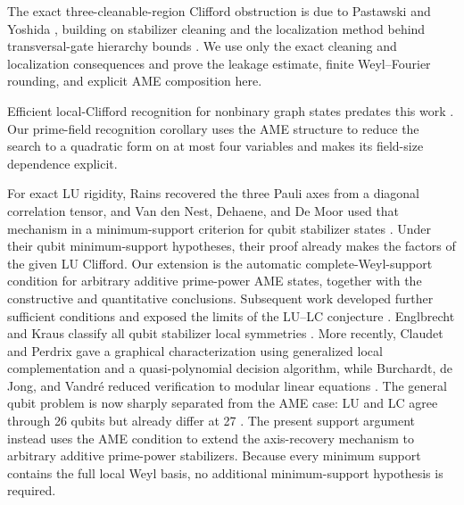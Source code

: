 The exact three-cleanable-region Clifford obstruction is due to Pastawski
and Yoshida \cite[Lemma~5]{PastawskiYoshida2015}, building on stabilizer
cleaning \cite[Lemma~1]{BravyiTerhal2009} and the localization method behind
transversal-gate hierarchy bounds
\cite{BravyiKonig2013,JochymOConnorKubicaYoder2018}.  We use only the exact
cleaning and localization consequences and prove the leakage estimate,
finite Weyl--Fourier rounding, and explicit AME composition here.

Efficient local-Clifford recognition for nonbinary graph states predates
this work \cite{BahramgiriBeigi2007Graph,BahramgiriBeigi2007Algorithm}.
Our prime-field recognition corollary uses the AME structure to reduce the
search to a quadratic form on at most four variables and makes its
field-size dependence explicit.

For exact LU rigidity, Rains recovered the three Pauli axes from a diagonal
correlation tensor, and Van den Nest, Dehaene, and De Moor used that mechanism
in a minimum-support criterion for qubit stabilizer states
\cite[Theorem~13]{Rains1999}
\cite[Theorem~1 and Corollary~1]{VanDenNestDehaeneDeMoor2005}.
Under their qubit minimum-support hypotheses, their proof already makes
the factors of the given LU Clifford.  Our extension is the automatic
complete-Weyl-support condition for arbitrary additive prime-power AME
states, together with the constructive and quantitative conclusions.
Subsequent work developed further sufficient conditions and exposed the
limits of the LU--LC conjecture
\cite{ZengChungCrossChuang2007,GrossVanDenNest2008,JiChenWeiYing2008}.
Englbrecht and Kraus classify all qubit stabilizer local symmetries
\cite{EnglbrechtKraus2020}.  More recently, Claudet and Perdrix gave a
graphical characterization using generalized local complementation and a
quasi-polynomial decision algorithm, while Burchardt, de Jong, and Vandr\'e
reduced verification to modular linear equations
\cite{ClaudetPerdrix2024,ClaudetPerdrix2025Algorithm,
BurchardtDeJongVandre2024}.  The general qubit problem is now sharply
separated from the AME case: LU and LC agree through 26 qubits but already
differ at 27 \cite{Claudet2026Minimal}.  The present support argument
instead uses the AME condition to extend the axis-recovery mechanism to
arbitrary additive prime-power stabilizers.  Because every minimum support
contains the full local Weyl basis, no additional minimum-support
hypothesis is required.

